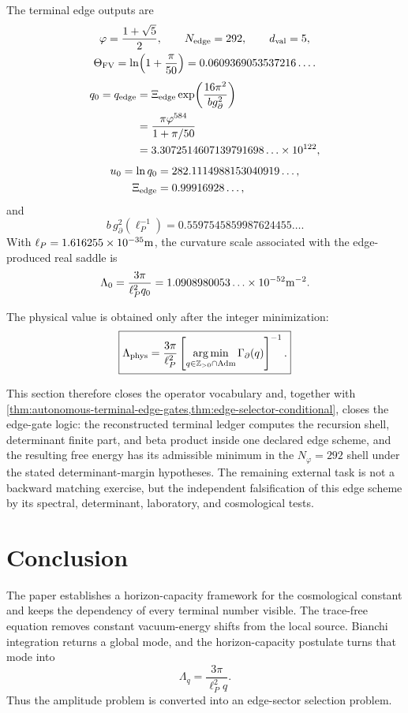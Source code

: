 \documentclass[aps,prd,reprint,nofootinbib,superscriptaddress,floatfix]{revtex4-2}
\numberwithin{equation}{section}
\theoremstyle{definition}
\theoremstyle{plain}
\begin{document}
The terminal edge outputs are
\[
\begin{gathered}
\varphi=\frac{1+\sqrt5}{2},\qquad
N_{\rm edge}=292,\qquad
d_{\rm val}=5,\\
\Theta_{\rm FV}=\ln\!\left(1+\frac{\pi}{50}\right)
=0.0609369053537216\ldots .
\end{gathered}
\]
\[
\begin{aligned}
q_0=q_{\rm edge}
&=
\Xi_{\rm edge}
\exp\!\left(\frac{16\pi^2}{b g_\partial^2}\right)\\
&=
\frac{\pi\varphi^{584}}{1+\pi/50}\\
&=
3.3072514607139791698\ldots\times10^{122},
\end{aligned}
\]
\[
\begin{aligned}
u_0=\ln q_0
&=
282.1114988153040919\ldots,\\
\Xi_{\rm edge}
&=0.99916928\ldots,
\end{aligned}
\]
and
\[
b\,g_\partial^2(\ell_P^{-1})
=
0.5597545859987624455\ldots .
\]
With \(\ell_P=1.616255\times10^{-35}{\rm m}\), the curvature scale associated
with the edge-produced real saddle is
\[
\Lambda_0
=
\frac{3\pi}{\ell_P^2q_0}
=
1.0908980053\ldots\times10^{-52}{\rm m}^{-2}.
\]

The physical value is obtained only after the integer minimization:
\[
\boxed{
\Lambda_{\rm phys}
=
\frac{3\pi}{\ell_P^2}
\left[
\operatorname*{arg\,min}_{q\in\mathbb Z_{>0}\cap{\rm Adm}}
\Gamma_\partial(q)
\right]^{-1}.
}
\]

This section therefore closes the operator vocabulary and, together with \cref{thm:autonomous-terminal-edge-gates,thm:edge-selector-conditional}, closes the edge-gate logic: the reconstructed terminal ledger computes the recursion shell, determinant finite part, and beta product inside one declared edge scheme, and the resulting free energy has its admissible minimum in the \(N_\varphi=292\) shell under the stated determinant-margin hypotheses.  The remaining external task is not a backward matching exercise, but the independent falsification of this edge scheme by its spectral, determinant, laboratory, and cosmological tests.

\section{Conclusion}

The paper establishes a horizon-capacity framework for the cosmological
constant and keeps the dependency of every terminal number visible.  The
trace-free equation removes constant vacuum-energy shifts from the local source.
Bianchi integration returns a global mode, and the horizon-capacity postulate
turns that mode into
\[
\Lambda_q=\frac{3\pi}{\ell_P^2q}.
\]
Thus the amplitude problem is converted into an edge-sector selection problem.
\end{document}
